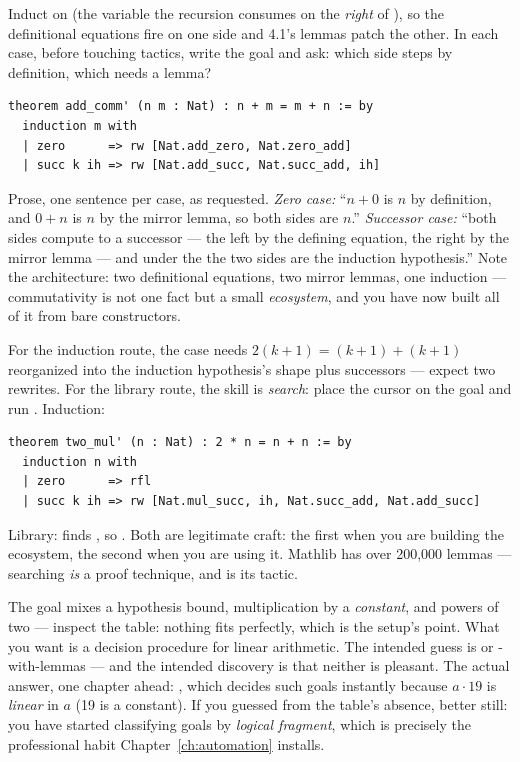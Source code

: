 \pathway Induct on  (the variable the recursion consumes on the
\emph{right} of ), so the definitional equations fire on one
side and 4.1's lemmas patch the other. In each case, before touching
tactics, write the goal and ask: which side steps by definition, which
needs a lemma?
\answer
\begin{lstlisting}[language=Lean]
theorem add_comm' (n m : Nat) : n + m = m + n := by
  induction m with
  | zero      => rw [Nat.add_zero, Nat.zero_add]
  | succ k ih => rw [Nat.add_succ, Nat.succ_add, ih]
\end{lstlisting}
Prose, one sentence per case, as requested. \emph{Zero case:} ``$n + 0$ is
$n$ by definition, and $0 + n$ is $n$ by the mirror lemma, so both sides
are $n$.'' \emph{Successor case:} ``both sides compute to a successor ---
the left by the defining equation, the right by the mirror lemma --- and
under the  the two sides are the induction hypothesis.'' Note
the architecture: two definitional equations, two mirror lemmas, one
induction --- commutativity is not one fact but a small \emph{ecosystem},
and you have now built all of it from bare constructors.

\pathway For the induction route, the  case needs
$2(k+1) = (k+1) + (k+1)$ reorganized into the induction hypothesis's shape
plus successors --- expect two rewrites. For the library route, the skill
is \emph{search}: place the cursor on the goal and run .
\answer Induction:
\begin{lstlisting}[language=Lean]
theorem two_mul' (n : Nat) : 2 * n = n + n := by
  induction n with
  | zero      => rfl
  | succ k ih => rw [Nat.mul_succ, ih, Nat.succ_add, Nat.add_succ]
\end{lstlisting}
Library:  finds , so
. Both
are legitimate craft: the first when you are building the ecosystem, the
second when you are using it. Mathlib has over 200{,}000 lemmas ---
searching \emph{is} a proof technique, and  is its tactic.

\pathway The goal mixes a hypothesis bound, multiplication by a
\emph{constant}, and powers of two --- inspect the table: nothing fits
perfectly, which is the setup's point. What you want is a decision
procedure for linear arithmetic.
\answer The intended guess is  or -with-lemmas ---
and the intended discovery is that neither is pleasant. The actual answer,
one chapter ahead: , which decides such goals instantly
because $a \cdot 19$ is \emph{linear} in $a$ (19 is a constant). If you
guessed  from the table's absence, better still: you have
started classifying goals by \emph{logical fragment}, which is precisely
the professional habit Chapter~\ref{ch:automation} installs.

